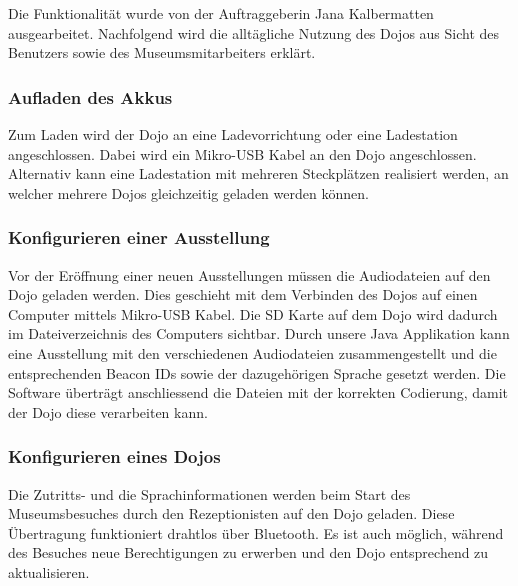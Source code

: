 Die Funktionalität wurde von der Auftraggeberin Jana Kalbermatten ausgearbeitet. Nachfolgend wird die alltägliche Nutzung des Dojos aus Sicht des Benutzers sowie des Museumsmitarbeiters erklärt.
\subsubsection{Aufladen des Akkus}
Zum Laden wird der Dojo an eine Ladevorrichtung oder eine Ladestation angeschlossen. Dabei wird ein Mikro-USB Kabel an den Dojo angeschlossen. Alternativ kann eine Ladestation mit mehreren Steckplätzen realisiert werden, an welcher mehrere Dojos gleichzeitig geladen werden können.
\subsubsection{Konfigurieren einer Ausstellung}
Vor der Eröffnung einer neuen Ausstellungen müssen die Audiodateien auf den Dojo geladen werden. Dies geschieht mit dem Verbinden des Dojos auf einen Computer mittels Mikro-USB Kabel. Die SD Karte auf dem Dojo wird dadurch im Dateiverzeichnis des Computers sichtbar. Durch unsere Java Applikation kann eine Ausstellung mit den verschiedenen Audiodateien zusammengestellt und die entsprechenden Beacon IDs sowie der dazugehörigen Sprache gesetzt werden. Die Software überträgt anschliessend die Dateien mit der korrekten Codierung, damit der Dojo diese verarbeiten kann.

\subsubsection{Konfigurieren eines Dojos}
Die Zutritts- und die Sprachinformationen werden beim Start des Museumsbesuches durch den Rezeptionisten auf den Dojo geladen. Diese Übertragung funktioniert drahtlos über Bluetooth. Es ist auch möglich, während des Besuches neue Berechtigungen zu erwerben und den Dojo entsprechend zu aktualisieren.

